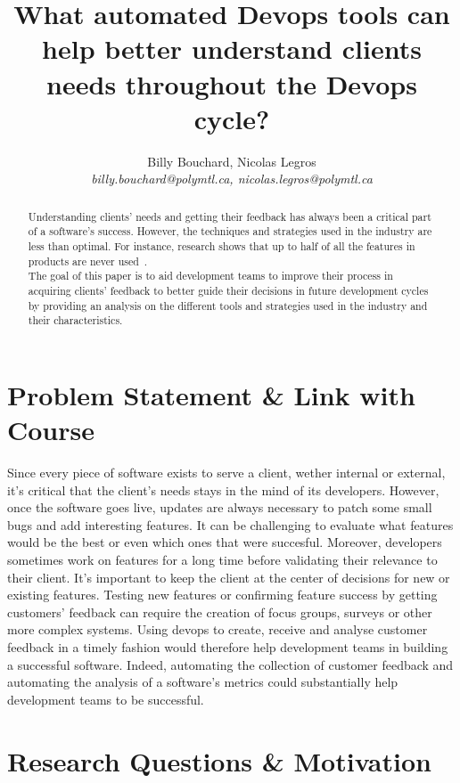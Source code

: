 \documentclass[10pt, conference]{IEEEtran}
\title{What automated Devops tools can help better understand clients needs 
  throughout the Devops cycle?}
\author{Billy Bouchard, Nicolas Legros    \\
    \emph{billy.bouchard@polymtl.ca, nicolas.legros@polymtl.ca}}
\begin{document}
\maketitle

\begin{abstract}
Understanding clients' needs and getting their feedback has always been 
a critical part of a software's success. However, the techniques and strategies
used in the industry are less than optimal. For instance, 
research shows that up to half of all the features in products are never 
used~\cite{olsson-bosch-15}.\\

The goal of this paper is to aid development teams to improve their process 
in acquiring clients' feedback to better guide their decisions in future development
cycles by providing an analysis on the different tools and strategies used 
in the industry and their characteristics.
\end{abstract}

\section{Problem Statement \& Link with Course}
\label{sec:statement}

Since every piece of software exists to serve a client, wether internal or external,
it's critical that the client's needs stays in the mind of its developers.
However, once the software goes live, updates are always necessary to patch 
some small bugs and add interesting features.
It can be challenging to evaluate what features would be the best or even 
which ones that were succesful.
Moreover, developers sometimes work on features for a long time before 
validating their relevance to their client. It's important to keep the client 
at the center of decisions for new or existing features.
Testing new features or confirming feature success 
by getting customers' feedback can require the creation of focus groups, 
surveys or other more complex systems.
Using devops to create, receive and analyse customer feedback in a timely 
fashion would therefore help development teams in building a successful software.
Indeed, automating the collection of customer feedback and automating the analysis of 
a software's metrics could substantially help development teams to be successful.

\section{Research Questions \& Motivation}
\label{sec:research-idea}
\end{document}
